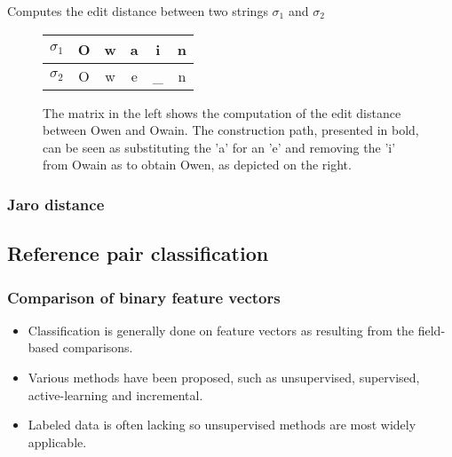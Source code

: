 \documentclass[paper=a4, fontsize=11pt]{scrartcl}
\begin{document}
\begin{algorithm}
    
    \caption{Computes the edit distance between two strings $\sigma_1$ and $\sigma_2$}
    \label{alg:edit_distance}
\end{algorithm}

\begin{figure}
    \centering
    \begin{minipage}{.65\textwidth}
        \centering
        
    \end{minipage}%
    \begin{minipage}{.35\textwidth}
        \centering
        \begin{tabular}{c||c|c|c|c|c}
            $\sigma_1$ & O & w & a & i & n \\\hline
            $\sigma_2$ & O & w & e & \_ & n
        \end{tabular}
    \end{minipage}
    \caption{The matrix in the left shows the computation of the edit distance between Owen and Owain. The construction path, presented in bold, can be seen as substituting the 'a' for an 'e' and removing the 'i' from Owain as to obtain Owen, as depicted on the right.}
    \label{fig:edit_distance}
\end{figure}

\subsubsection{Jaro distance}

\subsection{Reference pair classification}

\subsubsection{Comparison of binary feature vectors}
\begin{itemize}
    \item Classification is generally done on feature vectors as resulting from the field-based comparisons.
    \item Various methods have been proposed, such as unsupervised, supervised, active-learning and incremental.
    \item Labeled data is often lacking so unsupervised methods are most widely applicable.
\end{itemize}
\end{document}
